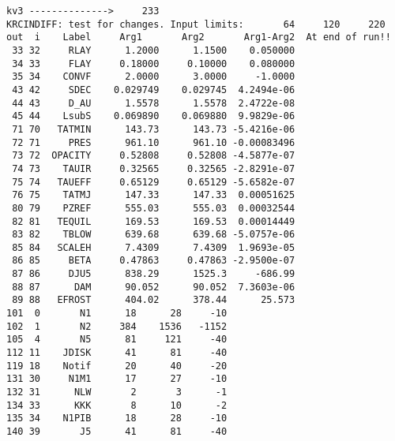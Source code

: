\documentclass{article}
\begin{document}
\begin{verbatim}
kv3 -------------->     233
KRCINDIFF: test for changes. Input limits:       64     120     220
out  i    Label     Arg1       Arg2       Arg1-Arg2  At end of run!!
 33 32     RLAY      1.2000      1.1500    0.050000
 34 33     FLAY     0.18000     0.10000    0.080000
 35 34    CONVF      2.0000      3.0000     -1.0000
 43 42     SDEC    0.029749    0.029745  4.2494e-06
 44 43     D_AU      1.5578      1.5578  2.4722e-08
 45 44    LsubS    0.069890    0.069880  9.9829e-06
 71 70   TATMIN      143.73      143.73 -5.4216e-06
 72 71     PRES      961.10      961.10 -0.00083496
 73 72  OPACITY     0.52808     0.52808 -4.5877e-07
 74 73    TAUIR     0.32565     0.32565 -2.8291e-07
 75 74   TAUEFF     0.65129     0.65129 -5.6582e-07
 76 75    TATMJ      147.33      147.33  0.00051625
 80 79    PZREF      555.03      555.03  0.00032544
 82 81   TEQUIL      169.53      169.53  0.00014449
 83 82    TBLOW      639.68      639.68 -5.0757e-06
 85 84   SCALEH      7.4309      7.4309  1.9693e-05
 86 85     BETA     0.47863     0.47863 -2.9500e-07
 87 86     DJU5      838.29      1525.3     -686.99
 88 87      DAM      90.052      90.052  7.3603e-06
 89 88   EFROST      404.02      378.44      25.573
101  0       N1      18      28     -10
102  1       N2     384    1536   -1152
105  4       N5      81     121     -40
112 11    JDISK      41      81     -40
119 18    Notif      20      40     -20
131 30     N1M1      17      27     -10
132 31      NLW       2       3      -1
134 33      KKK       8      10      -2
135 34    N1PIB      18      28     -10
140 39       J5      41      81     -40


\end{verbatim}
\end{document}
